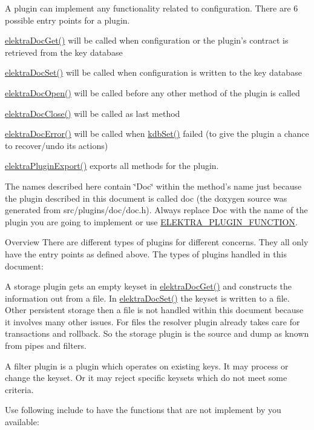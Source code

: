 A plugin can implement any functionality related to configuration. There are 6 possible entry points for a plugin.
\begin{DoxyItemize}
\item \hyperlink{group__plugin_gacb69f3441c6d84241b4362f958fbe313}{elektra\+Doc\+Get()} will be called when configuration or the plugin's contract is retrieved from the key database
\item \hyperlink{group__plugin_gae65781a1deb34efc79c8cb9d9174842c}{elektra\+Doc\+Set()} will be called when configuration is written to the key database
\item \hyperlink{group__plugin_ga23c2eb3584e38a4d494eb8f91e5e3d8d}{elektra\+Doc\+Open()} will be called before any other method of the plugin is called
\item \hyperlink{group__plugin_ga1236aefe5b2baf8b7bf636ba5aa9ea29}{elektra\+Doc\+Close()} will be called as last method
\item \hyperlink{group__plugin_gad74b35f558ac7c3262f6069c5c47dc79}{elektra\+Doc\+Error()} will be called when \hyperlink{group__kdb_ga11436b058408f83d303ca5e996832bcf}{kdb\+Set()} failed (to give the plugin a chance to recover/undo its actions)
\item \hyperlink{group__plugin_ga8dd092048e972a3f0c9c9f54eb41576e}{elektra\+Plugin\+Export()} exports all methods for the plugin.
\end{DoxyItemize}

The names described here contain \char`\"{}\+Doc\char`\"{} within the method's name just because the plugin described in this document is called doc (the doxygen source was generated from src/plugins/doc/doc.\+h). Always replace Doc with the name of the plugin you are going to implement or use \hyperlink{group__plugin_ga34d1a66f0a6e89cfd20f4014a9975a2a}{E\+L\+E\+K\+T\+R\+A\+\_\+\+P\+L\+U\+G\+I\+N\+\_\+\+F\+U\+N\+C\+T\+I\+O\+N}.

\begin{DoxyParagraph}{Overview}
There are different types of plugins for different concerns. They all only have the entry points as defined above. The types of plugins handled in this document\+:
\begin{DoxyItemize}
\item A storage plugin gets an empty keyset in \hyperlink{group__plugin_gacb69f3441c6d84241b4362f958fbe313}{elektra\+Doc\+Get()} and constructs the information out from a file. In \hyperlink{group__plugin_gae65781a1deb34efc79c8cb9d9174842c}{elektra\+Doc\+Set()} the keyset is written to a file. ~\newline
 Other persistent storage then a file is not handled within this document because it involves many other issues. For files the resolver plugin already takes care for transactions and rollback. So the storage plugin is the source and dump as known from pipes and filters.
\item A filter plugin is a plugin which operates on existing keys. It may process or change the keyset. Or it may reject specific keysets which do not meet some criteria.
\end{DoxyItemize}
\end{DoxyParagraph}
Use following include to have the functions that are not implement by you available\+:


